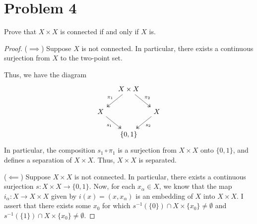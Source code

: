 \documentclass[fontsize=11pt]{scrartcl} %
\numberwithin{equation}{section} %
\numberwithin{figure}{section} %
\numberwithin{table}{section} %
\begin{document}
\section*{Problem 4}
Prove that $X\times X$ is connected if and only if $X$ is.
\\
\begin{proof}
    ($\implies$)
    Suppose $X$ is not connected. In particular, there exists a continuous
    surjection from $X$ to the two-point set.

    Thus, we have the diagram
    \[
        \begin{tikzcd}[column sep=small]
            &X\times X
            \arrow[two heads]{dl}[swap]{\pi_1}
            \arrow[two heads]{dr}{\pi_2}
            &\\
            X
            \arrow[two heads]{dr}[swap]{s_1} 
            &&
            X
            \arrow[two heads]{dl}{s_2}\\
            &\{0,1\}&
        \end{tikzcd}
    \]
    In particular, the composition $s_1\circ\pi_1$ is a surjection from
    $X\times X$ onto $\{0,1\}$, and defines a separation of $X\times
    X$. Thus, $X\times X$ is separated.

    ($\impliedby$)
    Suppose $X\times X$ is not connected. In particular, there exists a
    continuous surjection $s:X\times X\to\{0,1\}$. Now, for each $x_{\alpha}\in
    X$, we know that the map $i_{\alpha}:X\to X\times X$ given by
    $i(x)=(x,x_{\alpha})$ is an embedding of $X$ into $X\times X$. I assert that
    there exists some $x_0$ for which $s^{-1}(\{0\})\cap X\times\{x_0\}\neq
    \emptyset$ and $s^{-1}(\{1\})\cap X\times\{x_0\}\neq \emptyset$.

\end{proof}
\end{document}
